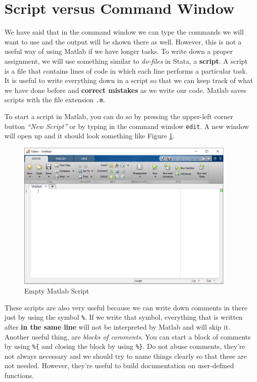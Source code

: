 \documentclass[a4paper,11pt]{article}
\begin{document}
\section{Script versus Command Window}

We have said that in the command window we can type the commands we will want to use and the output will be shown there as well. However, this is not a useful way of using Matlab if we have longer tasks. To write down a proper assignment, we will use something similar to \textit{do-files} in Stata, a \textbf{script}. A script is a file that contains lines of code in which each line performs a particular task. It is useful to write everything down in a script so that we can keep track of what we have done before and \textbf{correct mistakes} as we write our code. Matlab saves scripts with the file extension \verb;.m;.

To start a script in Matlab, you can do so by pressing the upper-left corner button \textit{``New Script''} or by typing in the command window \verb;edit;. A new window will open up and it should look something like Figure \ref{script}.

\begin{figure}
\centering
	\includegraphics[width = 0.95\textwidth]{./figures/script1.png}
	\caption{Empty Matlab Script}
	\label{script}
\end{figure} 

These scripts are also very useful because we can write down comments in there just by using the symbol \verb;%;. If we write that symbol, everything that is written after \textbf{in the same line} will not be interpreted by Matlab and will skip it. Another useful thing, are \textit{blocks of comments}. You can start a block of comments by using \verb;%{; and closing the block by using \verb;%};. Do not abuse comments, they're not always necessary and we should try to name things clearly so that these are not needed. However, they're useful to build documentation on user-defined functions.
\end{document}
